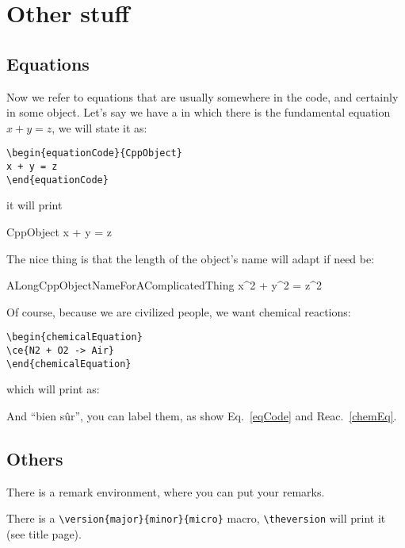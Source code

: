 \documentclass{documentation}
\begin{document}
\chapter{Other stuff}

\section{Equations}

Now we refer to equations that are usually somewhere in the
code, and certainly in some object. Let's say we have a
in which there is the fundamental equation
$x + y = z$, we will state it as:
\begin{verbatim}
\begin{equationCode}{CppObject}
x + y = z
\end{equationCode}
\end{verbatim}
it will print
\begin{equationCode}{CppObject}
x + y = z
\label{eqCode}
\end{equationCode}
The nice thing is that the length of the object's name will adapt
if need be:
\begin{equationCode}{ALongCppObjectNameForAComplicatedThing}
x^2 + y^2 = z^2
\end{equationCode}

Of course, because we are civilized people, we want chemical
reactions:
\begin{verbatim}
\begin{chemicalEquation}
\ce{N2 + O2 -> Air}
\end{chemicalEquation}
\end{verbatim}
which will print as:
\begin{chemicalEquation}
\label{chemEq}
\end{chemicalEquation}

And ``bien s\^ur'', you can label them, as show Eq.~\ref{eqCode} and
Reac.~\ref{chemEq}.

\section{Others}

\begin{remark}
There is a \textsf{remark} environment, where you can
put your remarks.
\end{remark}


There is a \verb!\version{major}{minor}{micro}! macro,
\verb!\theversion! will print it (see title page).
\end{document}
